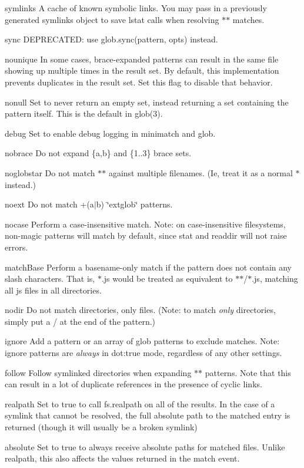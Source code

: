 \begin{DoxyItemize}
\item {\ttfamily symlinks} A cache of known symbolic links. You may pass in a previously generated {\ttfamily symlinks} object to save {\ttfamily lstat} calls when resolving {\ttfamily $\ast$$\ast$} matches.
\item {\ttfamily sync} D\+E\+P\+R\+E\+C\+A\+T\+ED\+: use {\ttfamily glob.\+sync(pattern, opts)} instead.
\item {\ttfamily nounique} In some cases, brace-\/expanded patterns can result in the same file showing up multiple times in the result set. By default, this implementation prevents duplicates in the result set. Set this flag to disable that behavior.
\item {\ttfamily nonull} Set to never return an empty set, instead returning a set containing the pattern itself. This is the default in glob(3).
\item {\ttfamily debug} Set to enable debug logging in minimatch and glob.
\item {\ttfamily nobrace} Do not expand {\ttfamily \{a,b\}} and {\ttfamily \{1..3\}} brace sets.
\item {\ttfamily noglobstar} Do not match {\ttfamily $\ast$$\ast$} against multiple filenames. (Ie, treat it as a normal {\ttfamily $\ast$} instead.)
\item {\ttfamily noext} Do not match {\ttfamily +(a$\vert$b)} \char`\"{}extglob\char`\"{} patterns.
\item {\ttfamily nocase} Perform a case-\/insensitive match. Note\+: on case-\/insensitive filesystems, non-\/magic patterns will match by default, since {\ttfamily stat} and {\ttfamily readdir} will not raise errors.
\item {\ttfamily match\+Base} Perform a basename-\/only match if the pattern does not contain any slash characters. That is, {\ttfamily $\ast$.js} would be treated as equivalent to {\ttfamily $\ast$$\ast$/$\ast$.js}, matching all js files in all directories.
\item {\ttfamily nodir} Do not match directories, only files. (Note\+: to match {\itshape only} directories, simply put a {\ttfamily /} at the end of the pattern.)
\item {\ttfamily ignore} Add a pattern or an array of glob patterns to exclude matches. Note\+: {\ttfamily ignore} patterns are {\itshape always} in {\ttfamily dot\+:true} mode, regardless of any other settings.
\item {\ttfamily follow} Follow symlinked directories when expanding {\ttfamily $\ast$$\ast$} patterns. Note that this can result in a lot of duplicate references in the presence of cyclic links.
\item {\ttfamily realpath} Set to true to call {\ttfamily fs.\+realpath} on all of the results. In the case of a symlink that cannot be resolved, the full absolute path to the matched entry is returned (though it will usually be a broken symlink)
\item {\ttfamily absolute} Set to true to always receive absolute paths for matched files. Unlike {\ttfamily realpath}, this also affects the values returned in the {\ttfamily match} event.
\end{DoxyItemize}

